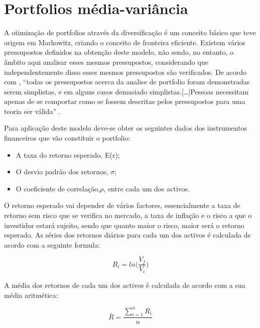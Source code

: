 \documentclass[
  12pt,
  a4paper,
  openany]{book}
\providecommand{\tightlist}{%
  \setlength{\itemsep}{0pt}\setlength{\parskip}{0pt}}
\begin{document}
\hypertarget{portfolios-muxe9dia-variuxe2ncia}{%
\section{Portfolios média-variância}\label{portfolios-muxe9dia-variuxe2ncia}}

A otimização de portfolios através da diversificação é um conceito básico que teve origem em Markowitz, criando o conceito de fronteira eficiente. Existem vários pressupostos definidos na obtenção deste modelo, não sendo, no entanto, o âmbito aqui analisar esses mesmos pressupostos, considerando que independentemente disso esses mesmos pressupostos são verificados. De acordo com \citet{Modern2013}, ``todas os pressupostos acerca da analise de portfolio foram demonstradas serem simplistas, e em alguns casos demasiado simplistas.{[}\ldots{]}Pessoas necessitam apenas de se comportar como se fossem descritas pelos pressupostos para uma teoria ser válida'' \citep[pp.5]{Modern2013}.

Para aplicação deste modelo deve-se obter os seguintes dados dos instrumentos financeiros que vão constituir o portfolio:

\begin{itemize}
\tightlist
\item
  A taxa do retorno esperado, E(r);
\item
  O desvio padrão dos retornos, \(\sigma\);
\item
  O coeficiente de correlação,\(\rho\), entre cada um dos activos.
\end{itemize}

O retorno esperado vai depender de vários factores, essencialmente a taxa de retorno sem risco que se verifica no mercado, a taxa de inflação e o risco a que o investidor estará sujeito, sendo que quanto maior o risco, maior será o retorno esperado.
As séries dos retornos diários para cada um dos activos é calculada de acordo com a seguinte formula:

\begin{equation} 
  R_i = ln\Big(\frac{V_f}{V_i}\Big)
  \label{eq:logRet}
\end{equation}

A média dos retornos de cada um dos activos é calculada de acordo com a sua média aritmética:

\begin{equation} 
  \overline{R} = \frac{\displaystyle\sum_{i=1}^n R_i}{n}
  \label{eq:meanRet}
\end{equation}
\end{document}

